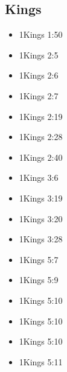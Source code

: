 \documentclass[14pt]{book}
\begin{document}
					\subsection{Kings}
				
			\begin{multicols}{2}\begin{itemize}
							
							\item 1Kings 1:50
							
							\item 1Kings 2:5
							
							\item 1Kings 2:6
							
							\item 1Kings 2:7
							
							\item 1Kings 2:19
							
							\item 1Kings 2:28
									
									\item 1Kings 2:40
									
									\item 1Kings 3:6
									
									\item 1Kings 3:19
									
									\item 1Kings 3:20
									
									\item 1Kings 3:28
									
									\item 1Kings 5:7
									
									\item 1Kings 5:9
									
									\item 1Kings 5:10
									
									\item 1Kings 5:10
									
									\item 1Kings 5:10
									
									\item 1Kings 5:11
									

\end{itemize}
\end{multicols}
\end{document}
